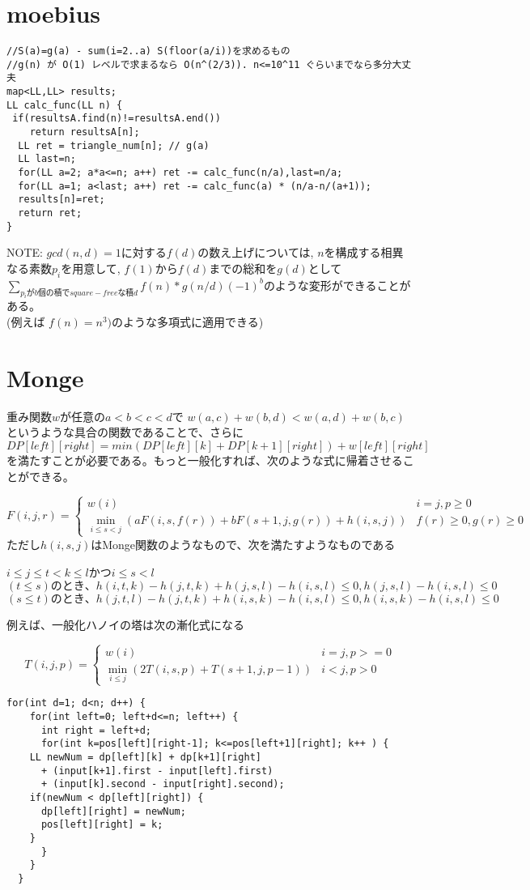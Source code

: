 \section{moebius}

\begin{lstlisting}[caption = gcd系関数]
//S(a)=g(a) - sum(i=2..a) S(floor(a/i))を求めるもの
//g(n) が O(1) レベルで求まるなら O(n^(2/3)). n<=10^11 ぐらいまでなら多分大丈夫 
map<LL,LL> results;
LL calc_func(LL n) {
 if(resultsA.find(n)!=resultsA.end())
    return resultsA[n];
  LL ret = triangle_num[n]; // g(a)
  LL last=n;
  for(LL a=2; a*a<=n; a++) ret -= calc_func(n/a),last=n/a;
  for(LL a=1; a<last; a++) ret -= calc_func(a) * (n/a-n/(a+1));
  results[n]=ret;
  return ret;
}
\end{lstlisting}

NOTE: $gcd(n,d)=1$に対する$f(d)$の数え上げについては, $n$を構成する相異なる素数$p_i$を用意して, $f(1)$から$f(d)$までの総和を$g(d)$として\\
$\sum_{p_iがb個の積でsquare-freeな積d}{ f(n)*g(n/d)(-1)^b }$のような変形ができることがある。\\
(例えば $f(n) = n^3)$のような多項式に適用できる)

\section{Monge}
重み関数$w$が任意の$a<b<c<d$で $w(a,c)+w(b,d)<w(a,d)+w(b,c)$というような具合の関数であることで、さらに$DP[left][right] = min(DP[left][k] + DP[k+1][right])+w[left][right]$を満たすことが必要である。もっと一般化すれば、次のような式に帰着させることができる。

\[
F(i,j,r) = \begin{cases}
  w(i) & i=j , p \geq 0 \\
  \min_{i \leq s <j} ( aF(i,s,f(r)) + bF(s+1,j,g(r)) +h(i,s,j) ) & f(r) \geq 0 , g(r) \geq 0
\end{cases} \]
 ただし$h(i,s,j)$はMonge関数のようなもので、次を満たすようなものである

$i \leq j \leq t < k \leq l$かつ$i \leq s < l$
\[
(t\leq s)のとき、 h(i,t,k) - h(j,t,k) + h(j,s,l) - h(i,s,l) \leq 0 , h(j,s,l) - h(i,s,l) \leq 0 \]
\[
(s \leq t)のとき、h(j,t,l) - h(j,t,k) + h(i,s,k) - h(i,s,l) \leq 0, h(i,s,k) - h(i,s,l) \leq 0 \]



例えば、一般化ハノイの塔は次の漸化式になる

\[
T(i,j,p) = \begin{cases}
w(i) & i=j , p>=0  \\
\min_{i \leq j}(2T(i,s,p) + T(s+1,j,p-1)) & i<j, p>0

\end{cases} \]
\begin{lstlisting}[caption=MongeDP]
  for(int d=1; d<n; d++) {
    for(int left=0; left+d<=n; left++) {
      int right = left+d;
      for(int k=pos[left][right-1]; k<=pos[left+1][right]; k++ ) {
	LL newNum = dp[left][k] + dp[k+1][right]
	  + (input[k+1].first - input[left].first)
	  + (input[k].second - input[right].second);
	if(newNum < dp[left][right]) {
	  dp[left][right] = newNum;
	  pos[left][right] = k;	  
	}
      }
    }
  } 
\end{lstlisting}


